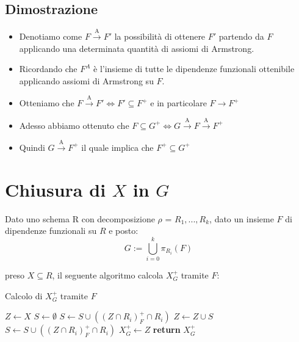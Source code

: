 \documentclass{article}
\begin{document}
\subsection{Dimostrazione}
\begin{itemize}
  \item Denotiamo come $F \xrightarrow{\text{A}} F'$ la possibilità di ottenere $F'$ partendo da $F$ applicando una determinata quantità di assiomi di Armstrong.
  \item  Ricordando che $F^A$ è l'insieme di tutte le dipendenze funzionali ottenibile applicando assiomi di Armstrong su $F$.
  \item Otteniamo che $F \xrightarrow{\text{A}} F' \Leftrightarrow F' \subseteq F^+$ e in particolare $F \rightarrow F^+$
  \item Adesso abbiamo ottenuto che $F \subseteq G^+ \Leftrightarrow G \xrightarrow{\text{A}} F \xrightarrow{\text{A}} F^+$ 
  \item Quindi $G \xrightarrow{\text{A}} F^+$ il quale implica che \textbf{$F^+ \subseteq G^+$}

\end{itemize}



\pagebreak
\section{Chiusura di $X$ in $G$}
Dato uno schema R con decomposizione $\rho$ = $R_1,...,R_k$, dato un insieme $F$ di dipendenze funzionali su $R$ e posto:
\[ G := \bigcup_{i=0}^{k} \pi_{R_i}(F) \]\par
preso $X \subseteq R$, il seguente algoritmo calcola $X_G^+$ tramite $F$:
\begin{algorithm}
  \caption{Calcolo di $X_G^+$ tramite $F$}
  \begin{algorithmic}[1]
          \State $Z \gets X$
          \State $S \gets \emptyset$
              \State $S \gets S \cup ((Z \cap R_i)^+_F \cap R_i)$
          \EndFor
              \State $Z \gets Z \cup S$
                  \State $S \gets S \cup ((Z \cap R_i)^+_F \cap R_i)$
              \EndFor
          \EndWhile
          \State $X_G^+ \gets Z$
          \State \textbf{return} $X_G^+$
      \EndProcedure
  \end{algorithmic}
\end{algorithm}
\end{document}
